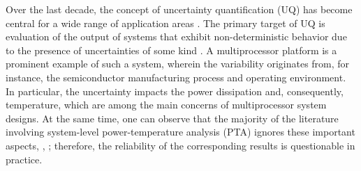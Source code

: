 Over the last decade, the concept of uncertainty quantification (UQ) has become central for a wide range of application areas \cite{xiu2010}. The primary target of UQ is evaluation of the output of systems that exhibit non-deterministic behavior due to the presence of uncertainties of some kind \cite{eldred2009}. A multiprocessor platform is a prominent example of such a system, wherein the variability originates from, for instance, the semiconductor manufacturing process and operating environment. In particular, the uncertainty impacts the power dissipation and, consequently, temperature, which are among the main concerns of multiprocessor system designs. At the same time, one can observe that the majority of the literature involving system-level power-temperature analysis (PTA) ignores these important aspects, \eg, \cite{rao2009, liu2010, rai2011, thiele2011, ukhov2012}; therefore, the reliability of the corresponding results is questionable in practice.

